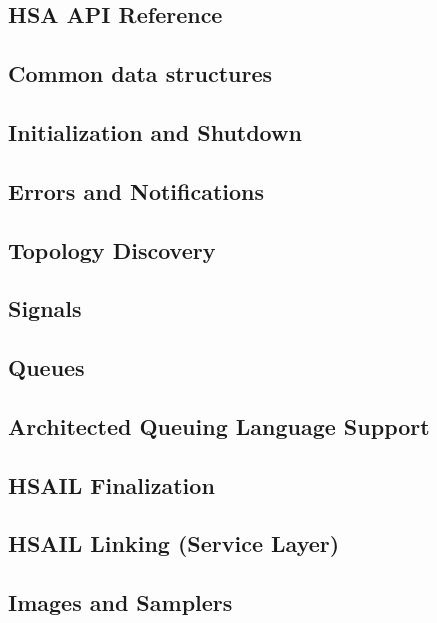 \documentclass[final]{book}
\begin{document}
\begin{appendices}

\chapter{HSA API Reference}

\section{Common data structures}


\section{Initialization and Shutdown}


\section{Errors and Notifications}


\section{Topology Discovery}


\section{Signals}


\section{Queues}


\section{Architected Queuing Language Support}


\section{HSAIL Finalization}


\section{HSAIL Linking (Service Layer)}


\section{Images and Samplers}


\end{appendices}
\end{document}
